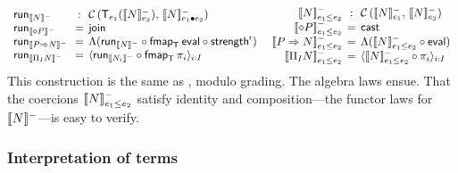 \documentclass[acmsmall,review,anonymous]{acmart}\settopmatter{printfolios=true,printccs=false,printacmref=false}
\theoremstyle{remark}
\begin{document}
\[
\begin{array}{l@{~~}c@{\hspace{1ex}}l}
  \run[\denn N] & : & \Hom {\T[e_1](\Denn N {e_2})} {\Denn N {e_1 \bu e_2}} \\
  \run[\denn {\diamond P}] & = & \tjoin \\
  \run[\denn {P \To N}]   & = & \Lambda(\run[\denn N] \circ
                                \fmap[\T]\teval \circ \strengthr) \\
  \run[\denn {\rect I N}] & = & \langle \run[\denn{N_i}] \comp
                                \fmap[\T]{\pi_i} \rangle_{i:I} \\
\end{array}
\
\begin{array}{r@{\hspace{1ex}}c@{\hspace{1ex}}l}
  \Denn N {e_1 \leq e_2} & : & \Hom {\Denn N {e_1}} {\Denn N {e_2}} \\
  \Denn {\diamond P} {e_1 \leq e_2} & = & \tcast \\
  \Denn {P \To N}   {e_1 \leq e_2} & = &
    \Lambda(\Denn N {e_1 \leq e_2} \comp \teval) \\
  \Denn {\rect I N} {e_1 \leq e_2} & = &
    \langle \Denn N {e_1 \leq e_2} \comp \pi_i {} \rangle_{i:I} \\
\end{array}
\]
This construction is the same as \citet{levy:hosc06}, modulo grading.
The algebra laws ensue.
That the coercions $\llbracket N\rrbracket^{-}_{e_1 \leq e_2}$
satisfy identity and composition---the functor
laws for $\llbracket N\rrbracket^{-}$---is easy to verify.


\subsubsection{Interpretation of terms}
\end{document}
